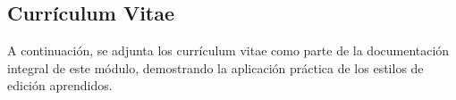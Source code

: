 \documentclass[runningheads]{llncs}
\begin{document}
\subsection{Currículum Vitae}
A continuación, se adjunta los currículum vitae como parte de la documentación integral de este módulo, demostrando la aplicación práctica de los estilos de edición aprendidos.



%
%
%
% 
% 
%
 
\end{document}
